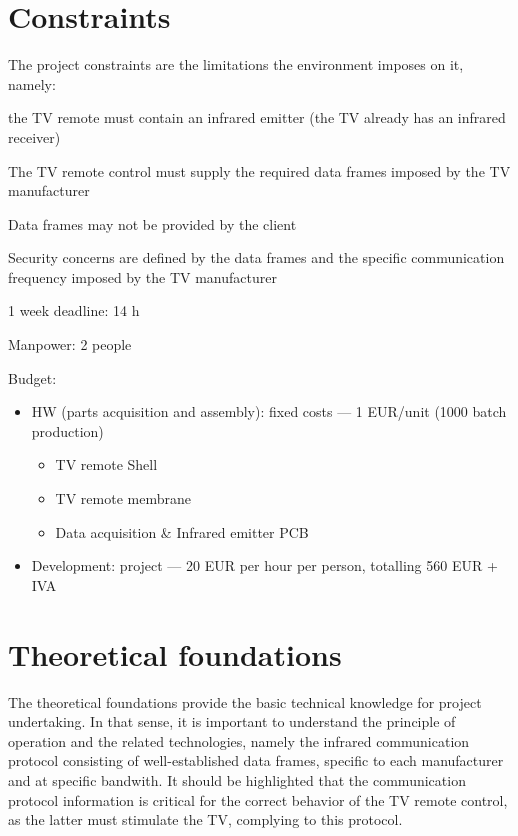 \section{Constraints}
\label{sec:constraints}
The project constraints are the limitations the environment imposes on it, namely:
\begin{item-c}
\item the TV remote must contain an infrared emitter (the TV already has an infrared receiver)
\item The TV remote control must supply the required data frames imposed by the TV
  manufacturer
\item Data frames may not be provided by the client
\item Security concerns are defined by the data frames and the specific
  communication frequency imposed by the TV manufacturer
\item 1 week deadline: 14 h
\item Manpower: 2 people
\item Budget:
  \begin{itemize}
  \item HW (parts acquisition and assembly): fixed costs --- 1 EUR/unit (1000
    batch production)
    \begin{itemize}
    \item TV remote Shell
    \item TV remote membrane
    \item Data acquisition \& Infrared emitter PCB
    \end{itemize}
  \item Development: project --- 20 EUR per hour per person, totalling 560 EUR +
    IVA
  \end{itemize}
\end{item-c}
%
  \vspace{-5mm}
%  
\section{Theoretical foundations}
\label{sec:theor-found}
The theoretical foundations provide the basic technical knowledge for project
undertaking. In that sense, it is important to understand the principle of
operation and the related technologies, namely the infrared communication
protocol consisting of well-established data frames, specific to each
manufacturer and at specific bandwith. It should be highlighted that the
communication protocol information is critical for the correct behavior of the
TV remote control, as the latter must stimulate the TV, complying to this protocol.

